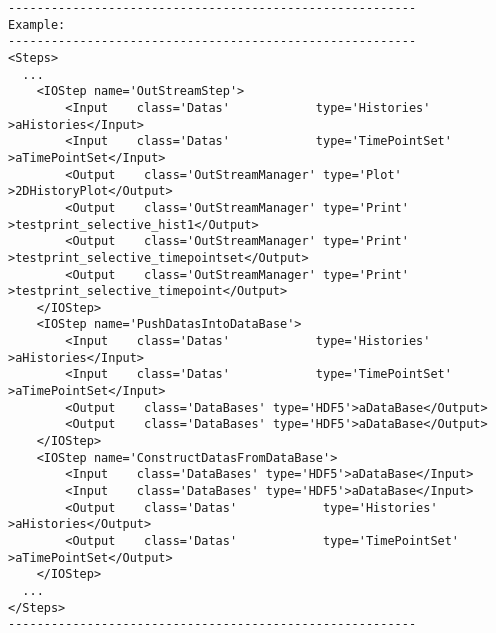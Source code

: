 \begin{lstlisting}[style=XML]
---------------------------------------------------------
Example:
---------------------------------------------------------
<Steps>
  ...
    <IOStep name='OutStreamStep'>
        <Input    class='Datas'            type='Histories'       >aHistories</Input>
        <Input    class='Datas'            type='TimePointSet' >aTimePointSet</Input>
        <Output    class='OutStreamManager' type='Plot'   >2DHistoryPlot</Output>
        <Output    class='OutStreamManager' type='Print'  >testprint_selective_hist1</Output>
        <Output    class='OutStreamManager' type='Print'  >testprint_selective_timepointset</Output>
        <Output    class='OutStreamManager' type='Print'   >testprint_selective_timepoint</Output>
    </IOStep>
    <IOStep name='PushDatasIntoDataBase'>
        <Input    class='Datas'            type='Histories'           >aHistories</Input>
        <Input    class='Datas'            type='TimePointSet'     >aTimePointSet</Input>
        <Output    class='DataBases' type='HDF5'>aDataBase</Output>
        <Output    class='DataBases' type='HDF5'>aDataBase</Output>
    </IOStep>
    <IOStep name='ConstructDatasFromDataBase'>
        <Input    class='DataBases' type='HDF5'>aDataBase</Input>
        <Input    class='DataBases' type='HDF5'>aDataBase</Input>
        <Output    class='Datas'            type='Histories'           >aHistories</Output>
        <Output    class='Datas'            type='TimePointSet'     >aTimePointSet</Output>
    </IOStep>
  ...
</Steps>
---------------------------------------------------------
\end{lstlisting}

